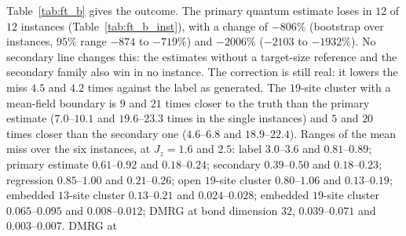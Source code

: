 \documentclass[aps,prx,onecolumn,10pt,nofootinbib,longbibliography,floatfix]{revtex4-2}
\theoremstyle{remark}
\newcommand{\Jz}{J_z}
\begin{document}
Table~\ref{tab:ft_b} gives the outcome. The primary quantum estimate loses in $12$ of $12$ instances (Table~\ref{tab:ft_b_inst}), %
with a change of $-806\%$ (bootstrap over instances, $95\%$ range $-874$ to $-719\%$) and $-2006\%$ ($-2103$ to %
$-1932\%$). No secondary line changes this: the estimates without a target-size reference and the secondary family also %
win in no instance. The correction is still real: it lowers the miss $4.5$ and $4.2$ times against the label as generated. %
The $19$-site cluster with a mean-field boundary is $9$ and $21$ times closer to the truth than the primary estimate %
($7.0$--$10.1$ and $19.6$--$23.3$ times in the single instances) and $5$ and $20$ times closer than the secondary one %
($4.6$--$6.8$ and $18.9$--$22.4$). Ranges of the mean miss over the six instances, at $\Jz=1.6$ and $2.5$: label %
$3.0$--$3.6$ and $0.81$--$0.89$; primary estimate $0.61$--$0.92$ and $0.18$--$0.24$; secondary $0.39$--$0.50$ and %
$0.18$--$0.23$; regression $0.85$--$1.00$ and $0.21$--$0.26$; open $19$-site cluster $0.80$--$1.06$ and %
$0.13$--$0.19$; embedded $13$-site cluster $0.13$--$0.21$ and $0.024$--$0.028$; embedded $19$-site cluster %
$0.065$--$0.095$ and $0.008$--$0.012$; DMRG at bond dimension $32$, $0.039$--$0.071$ and $0.003$--$0.007$. DMRG at %
\end{document}
